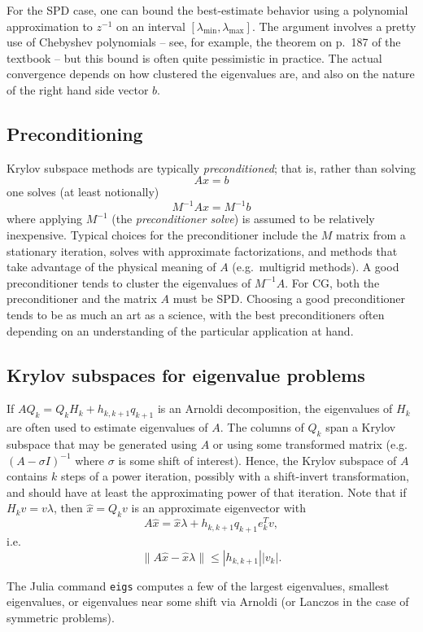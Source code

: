 \documentclass[12pt, leqno]{article}
\begin{document}
For the SPD case, one can bound the best-estimate behavior using a polynomial
approximation to $z^{-1}$ on an interval $[\lambda_{\min}, \lambda_{\max}]$.
The argument involves a pretty use of Chebyshev polynomials -- see,
for example, the theorem on p.~187 of the textbook -- but this bound
is often quite pessimistic in practice.  The actual convergence
depends on how clustered the eigenvalues are, and also on the nature
of the right hand side vector $b$.

\subsection{Preconditioning}

Krylov subspace methods are typically {\em preconditioned}; that is,
rather than solving
\[
  Ax = b
\]
one solves (at least notionally)
\[
  M^{-1} A x = M^{-1} b
\]
where applying $M^{-1}$ (the {\em preconditioner solve}) is assumed to
be relatively inexpensive.  Typical choices for the preconditioner
include the $M$ matrix from a stationary iteration, solves with
approximate factorizations, and methods that take advantage of
the physical meaning of $A$ (e.g.~multigrid methods).  A good
preconditioner tends to cluster the eigenvalues of $M^{-1} A$.
For CG, both the preconditioner and the matrix $A$ must be SPD.
Choosing a good preconditioner tends to be as much an art as a
science, with the best preconditioners often depending on an
understanding of the particular application at hand.

\subsection{Krylov subspaces for eigenvalue problems}

If $A Q_k = Q_k H_k + h_{k,k+1} q_{k+1}$ is an Arnoldi decomposition,
the eigenvalues of $H_k$ are often used to estimate eigenvalues of
$A$.  The columns of $Q_k$ span a Krylov subspace that may be
generated using $A$ or using some transformed matrix (e.g.
$(A-\sigma I)^{-1}$ where $\sigma$ is some shift of interest).
Hence, the Krylov subspace of $A$ contains $k$ steps of a power
iteration, possibly with a shift-invert transformation, and should
have at least the approximating power of that iteration.
Note that if $H_k v = v \lambda$, then $\hat{x} = Q_k v$ is an
approximate eigenvector with
\[
  A \hat{x} = \hat{x} \lambda + h_{k,k+1} q_{k+1} e_k^T v,
\]
i.e.
\[
  \|A \hat{x}-\hat{x} \lambda\| \leq |h_{k,k+1}| |v_k|.
\]

The Julia command {\tt eigs} computes a few of the largest
eigenvalues, smallest eigenvalues, or eigenvalues near some shift
via Arnoldi (or Lanczos in the case of symmetric problems).
\end{document}
